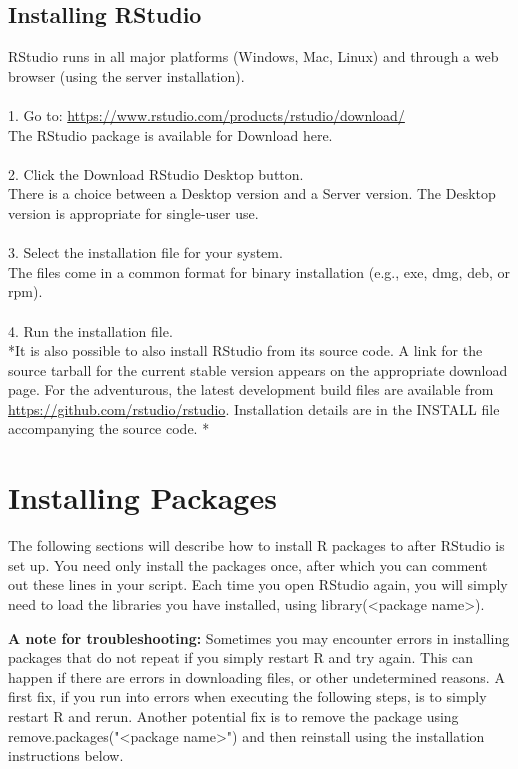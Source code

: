 \documentclass{article}
\begin{document}
\subsection{Installing RStudio}
RStudio runs in all major platforms (Windows, Mac, Linux) and through a web browser (using the server installation). \\  \\
1.	Go to: \url{https://www.rstudio.com/products/rstudio/download/}\\
The RStudio package is available for Download here.\\ \\ 
2.	Click the Download RStudio Desktop button. \\
There is a choice between a Desktop version and a Server version. The Desktop version is appropriate for single-user use.  \\ \\ 
3.	Select the installation file for your system. \\
The files come in a common format for binary installation (e.g., exe, dmg, deb, or rpm). \\ \\
4.	Run the installation file. \\


*It is also possible to also install RStudio from its source code. A link for the source tarball for the current stable version appears on the appropriate download page. For the adventurous, the latest development build files are available from \url{https://github.com/rstudio/rstudio}. Installation details are in the INSTALL file accompanying the source code. *




\section{Installing Packages}
The following sections will describe how to install R packages to after RStudio is set up. You need only install the packages once, after which you can comment out these lines in your script. Each time you open RStudio again, you will simply need to load the libraries you have installed, using library(\textless package name\textgreater).

\textbf{A note for troubleshooting:} Sometimes you may encounter errors in installing packages that do not repeat if you simply restart R and try again.  This can happen if there are errors in downloading files, or other undetermined reasons.  A first fix, if you run into errors when executing the following steps, is to simply restart R and rerun. Another potential fix is to remove the package using remove.packages("\textless package name\textgreater") and then reinstall using the installation instructions below.
\end{document}
